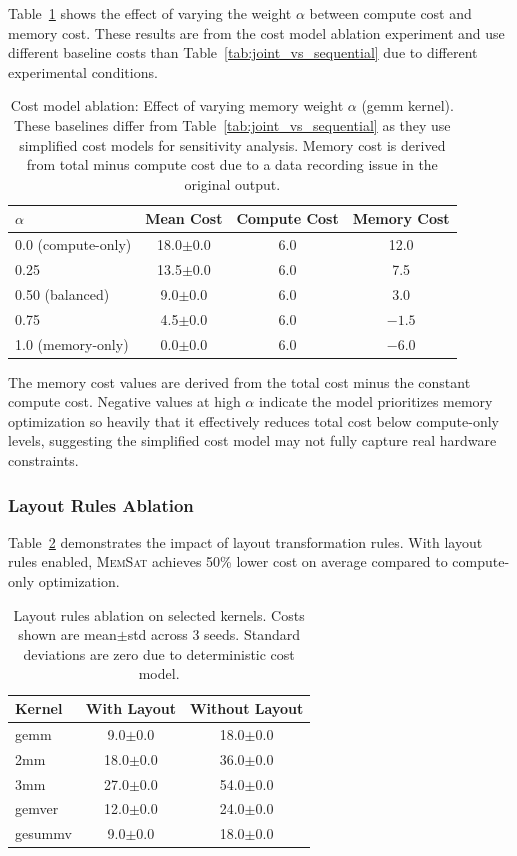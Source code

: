 \documentclass[11pt]{article}
\newcommand{\memsat}{\textsc{MemSat}}
\begin{document}
Table~\ref{tab:cost_model} shows the effect of varying the weight $\alpha$ between compute cost and memory cost. These results are from the cost model ablation experiment and use different baseline costs than Table~\ref{tab:joint_vs_sequential} due to different experimental conditions.

\begin{table}[t]
\caption{Cost model ablation: Effect of varying memory weight $\alpha$ (gemm kernel). These baselines differ from Table~\ref{tab:joint_vs_sequential} as they use simplified cost models for sensitivity analysis. Memory cost is derived from total minus compute cost due to a data recording issue in the original output.}
\label{tab:cost_model}
\centering
\begin{tabular}{lccc}
\toprule
$\alpha$ & Mean Cost & Compute Cost & Memory Cost \\
\midrule
0.0 (compute-only) & 18.0$\pm$0.0 & 6.0 & 12.0 \\
0.25 & 13.5$\pm$0.0 & 6.0 & 7.5 \\
0.50 (balanced) & 9.0$\pm$0.0 & 6.0 & 3.0 \\
0.75 & 4.5$\pm$0.0 & 6.0 & $-1.5$ \\
1.0 (memory-only) & 0.0$\pm$0.0 & 6.0 & $-6.0$ \\
\bottomrule
\end{tabular}
\end{table}

The memory cost values are derived from the total cost minus the constant compute cost. Negative values at high $\alpha$ indicate the model prioritizes memory optimization so heavily that it effectively reduces total cost below compute-only levels, suggesting the simplified cost model may not fully capture real hardware constraints.

\subsubsection{Layout Rules Ablation}

Table~\ref{tab:layout_ablation} demonstrates the impact of layout transformation rules. With layout rules enabled, \memsat{} achieves 50\% lower cost on average compared to compute-only optimization.

\begin{table}[t]
\caption{Layout rules ablation on selected kernels. Costs shown are mean$\pm$std across 3 seeds. Standard deviations are zero due to deterministic cost model.}
\label{tab:layout_ablation}
\centering
\begin{tabular}{lcc}
\toprule
Kernel & With Layout & Without Layout \\
\midrule
gemm & 9.0$\pm$0.0 & 18.0$\pm$0.0 \\
2mm & 18.0$\pm$0.0 & 36.0$\pm$0.0 \\
3mm & 27.0$\pm$0.0 & 54.0$\pm$0.0 \\
gemver & 12.0$\pm$0.0 & 24.0$\pm$0.0 \\
gesummv & 9.0$\pm$0.0 & 18.0$\pm$0.0 \\
\bottomrule
\end{tabular}
\end{table}
\end{document}
